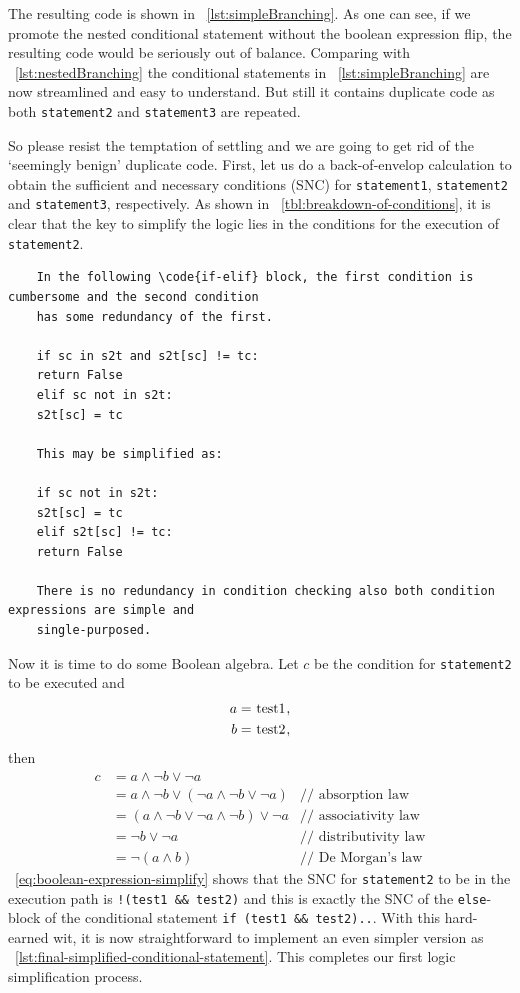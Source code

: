 \documentclass[oneside,11pt]{book}
\theoremstyle{definition}
\theoremstyle{remark}
\newcommand{\code}[1]{\mbox{\lstinline{#1}}}
\begin{document}
The resulting code is shown in ~\autoref{lst:simpleBranching}.
As one can see, if we promote the nested conditional statement without the boolean expression
flip, the resulting code would be seriously out of balance.
Comparing with ~\autoref{lst:nestedBranching} the conditional statements in
~\autoref{lst:simpleBranching} are now streamlined and easy to understand.
But still it contains duplicate code as both \code{statement2} and \code{statement3} are repeated.


So please resist the temptation of settling and we are going to get rid of the `seemingly benign'
duplicate code.
First, let us do a back-of-envelop calculation to
obtain the sufficient and necessary conditions (SNC) for \code{statement1}, \code{statement2}
and \code{statement3}, respectively.
As shown in ~\autoref{tbl:breakdown-of-conditions},
it is clear that the key to simplify the logic lies in the conditions for the
execution of \code{statement2}.

\begin{verbatim}
    In the following \code{if-elif} block, the first condition is cumbersome and the second condition
    has some redundancy of the first.

    if sc in s2t and s2t[sc] != tc:
    return False
    elif sc not in s2t:
    s2t[sc] = tc

    This may be simplified as:

    if sc not in s2t:
    s2t[sc] = tc
    elif s2t[sc] != tc:
    return False

    There is no redundancy in condition checking also both condition expressions are simple and
    single-purposed.
\end{verbatim}

Now it is time to do some Boolean algebra.
Let $c$ be the condition for \code{statement2} to be executed and
\begin{align*}
    a &= \text{\code{test1}}, \\
    b &= \text{\code{test2}},
\end{align*}
then
\begin{align}
    c &= a \land \lnot b \lor \lnot a  \nonumber \\
    &= a \land \lnot b \lor (\lnot a \land \lnot b \lor \lnot a \nonumber) & \text{// absorption law
    }\\
    &= (a \land \lnot b \lor \lnot a \land \lnot b) \lor \lnot a \nonumber & \text{// associativity
    law}\\
    &= \lnot b \lor \lnot a & \text{// distributivity law} \nonumber \\
    &=\lnot (a \land b) & \text{// De Morgan's law} \label{eq:boolean-expression-simplify}
\end{align}
~\autoref{eq:boolean-expression-simplify} shows that the SNC for
\code{statement2} to be in the execution path
is \code{!(test1 && test2)} and this is exactly the SNC of the
\code{else}-block of the conditional statement \code{if (test1 && test2)..}.
With this hard-earned wit, it is now straightforward to implement an even simpler version as
~\autoref{lst:final-simplified-conditional-statement}.
This completes our first logic simplification process.
\end{document}
